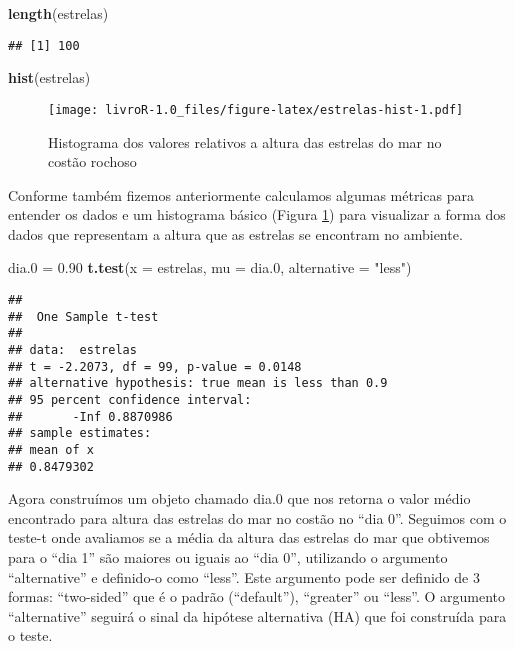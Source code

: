 \documentclass[titlepage, oneside, openany, a4paper]{book}
\newenvironment{Shaded}{\begin{snugshade}}{\end{snugshade}}
\newcommand{\DataTypeTok}[1]{\textcolor[rgb]{0.13,0.29,0.53}{#1}}
\newcommand{\FloatTok}[1]{\textcolor[rgb]{0.00,0.00,0.81}{#1}}
\newcommand{\KeywordTok}[1]{\textcolor[rgb]{0.13,0.29,0.53}{\textbf{#1}}}
\newcommand{\NormalTok}[1]{#1}
\newcommand{\StringTok}[1]{\textcolor[rgb]{0.31,0.60,0.02}{#1}}
\begin{document}
\begin{Shaded}
\begin{Highlighting}[]
\KeywordTok{length}\NormalTok{(estrelas)}
\end{Highlighting}
\end{Shaded}

\begin{verbatim}
## [1] 100
\end{verbatim}

\begin{Shaded}
\begin{Highlighting}[]
\KeywordTok{hist}\NormalTok{(estrelas)}
\end{Highlighting}
\end{Shaded}

\begin{figure}
\centering
\texttt{[image: livroR-1.0\_files/figure-latex/estrelas-hist-1.pdf]}
\caption{\label{fig:estrelas-hist}Histograma dos valores relativos a altura das estrelas do mar no costão rochoso}
\end{figure}

Conforme também fizemos anteriormente calculamos algumas métricas para entender os dados e um histograma básico (Figura \ref{fig:estrelas-hist}) para visualizar a forma dos dados que representam a altura que as estrelas se encontram no ambiente.

\begin{Shaded}
\begin{Highlighting}[]
\NormalTok{dia}\FloatTok{.0}\NormalTok{ =}\StringTok{ }\FloatTok{0.90}
\KeywordTok{t.test}\NormalTok{(}\DataTypeTok{x =}\NormalTok{ estrelas, }\DataTypeTok{mu =}\NormalTok{ dia}\FloatTok{.0}\NormalTok{, }\DataTypeTok{alternative =} \StringTok{"less"}\NormalTok{)}
\end{Highlighting}
\end{Shaded}

\begin{verbatim}
## 
##  One Sample t-test
## 
## data:  estrelas
## t = -2.2073, df = 99, p-value = 0.0148
## alternative hypothesis: true mean is less than 0.9
## 95 percent confidence interval:
##       -Inf 0.8870986
## sample estimates:
## mean of x 
## 0.8479302
\end{verbatim}

Agora construímos um objeto chamado dia.0 que nos retorna o valor médio encontrado para altura das estrelas do mar no costão no ``dia 0''. Seguimos com o teste-t onde avaliamos se a média da altura das estrelas do mar que obtivemos para o ``dia 1'' são maiores ou iguais ao ``dia 0'', utilizando o argumento ``alternative'' e definido-o como ``less''. Este argumento pode ser definido de 3 formas: ``two-sided'' que é o padrão (``default''), ``greater'' ou ``less''. O argumento ``alternative'' seguirá o sinal da hipótese alternativa (HA) que foi construída para o teste.
\end{document}
